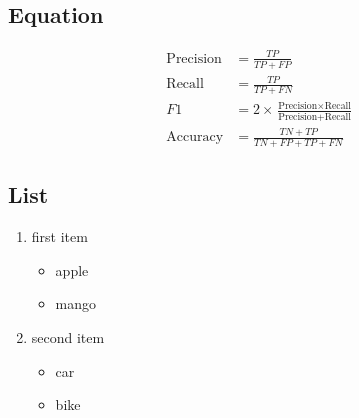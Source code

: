 \documentclass{article}
\begin{document}
\subsection{Equation}
\begin{align}
    \text{Precision} & = \frac{TP}{TP + FP} \tag{1}                                                                      \\
    \text{Recall}    & = \frac{TP}{TP + FN} \tag{2}                                                                      \\
    F1               & = 2 \times \frac{\text{Precision} \times \text{Recall}}{\text{Precision} + \text{Recall}} \tag{3} \\
    \text{Accuracy}  & = \frac{TN + TP}{TN + FP + TP + FN} \tag{4}
\end{align}

\subsection{List}
\begin{enumerate}
    \item first item
          \begin{itemize}
              \item apple
              \item mango
          \end{itemize}
    \item second item
          \begin{itemize}
              \item car
              \item bike
          \end{itemize}
\end{enumerate}
\end{document}
